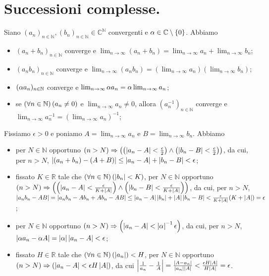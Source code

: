 \section{Successioni complesse.}\label{SuccessioniComplesse}
\begin{Theorem}
	Siano $(a_n)_{n \in \mathbb{N}}, (b_n)_{n \in \mathbb{N}} \in \mathbb{C}^\mathbb{N}$ convergenti e $\alpha \in \mathbb{C} \setminus \lbrace 0 \rbrace$. Abbiamo
	\begin{itemize}
		\item $(a_n + b_n)_{n \in \mathbb{N}}$ converge e $\lim_{n \rightarrow \infty} (a_n + b_n) = \lim_{n \rightarrow \infty} a_n + \lim_{n \rightarrow \infty} b_n$;
		\item $(a_n b_n)_{n \in \mathbb{N}}$ converge e $\lim_{n \rightarrow \infty} (a_n b_n) = \left ( \lim_{n \rightarrow \infty} a_n \right ) \left ( \lim_{n \rightarrow \infty} b_n \right )$;
		\item $(\alpha a_n)_{n \in \mathbb{N}}$ converge e $\lim_{n \rightarrow \infty} \alpha a_n = \alpha \lim_{n \rightarrow \infty} a_n$;
		\item se $\left ( \forall n \in \mathbb{N} \right ) \left ( a_n \neq 0 \right )$ e $\lim_{n \rightarrow \infty} a_n \neq 0$, allora $(a_n^{-1})_{n \in \mathbb{N}}$ converge e $\lim_{n \rightarrow \infty} a_n^{-1} = \left ( \lim_{n \rightarrow \infty} a_n \right )^{-1}$;
	\end{itemize}
\end{Theorem}
\Proof Fissiamo $\epsilon > 0$ e poniamo $A = \lim_{n \rightarrow \infty} a_n$ e $B = \lim_{n \rightarrow \infty} b_n$. Abbiamo
\begin{itemize}
	\item per $N \in \mathbb{N}$ opportuno $\left ( n > N \right ) \Rightarrow \left ( \left ( \left \lvert a_n - A \right \rvert < \frac{\epsilon}{2} \right ) \wedge \left ( \left \lvert b_n - B \right \rvert < \frac{\epsilon}{2} \right ) \right )$, da cui, per $n > N$, $\left \lvert (a_n + b_n) - (A + B) \right \rvert \leq \left \lvert a_n - A \right \rvert + \left \lvert b_n - B \right \rvert < \epsilon$;
	\item fissato $K \in \mathbb{R}$ tale che $\left ( \forall n \in \mathbb{N} \right ) \left ( \left \lvert b_n \right \rvert < K \right )$, per $N \in \mathbb{N}$ opportuno $\left ( n > N \right ) \Rightarrow \left ( \left ( \left \lvert a_n - A \right \rvert < \frac{\epsilon}{K + \left \lvert A \right \rvert} \right ) \wedge \left ( \left \lvert b_n - B \right \rvert < \frac{\epsilon}{K + \left \lvert A \right \rvert} \right ) \right )$, da cui, per $n > N$, $\left \lvert a_nb_n - AB \right \rvert = \left \lvert a_nb_n - Ab_n + Ab_n - AB \right \rvert \leq \left \lvert a_n - A \right \rvert\left \lvert b_n \right \rvert + \left \lvert A \right \rvert\left \lvert b_n - B \right \rvert < \frac{\epsilon}{K + \left \lvert A \right \rvert} (K + \left \lvert A \right \rvert) = \epsilon$;
	\item per $N \in \mathbb{N}$ opportuno $\left ( n > N \right ) \Rightarrow \left ( \left \lvert a_n - A \right \rvert < \left \lvert \alpha \right \rvert^{-1}\epsilon \right )$, da cui, per $n > N$, $\left \lvert \alpha a_n - \alpha A \right \rvert = \left \lvert \alpha \right \rvert\left \lvert a_n - A \right \rvert < \epsilon$;
	\item fissato $H \in \mathbb{R}$ tale che $\left ( \forall n \in \mathbb{N} \right ) \left ( \left \lvert a_n \right \rvert \right ) < H$, per $N \in \mathbb{N}$ opportuno $\left ( n > N \right ) \Rightarrow \left ( \left \lvert a_n - A \right \rvert < \epsilon H \left \lvert A \right \rvert \right )$, da cui $\left \lvert \frac{1}{a_n} - \frac{1}{A} \right \rvert = \frac{\left \lvert A - a_n \right \rvert}{\left \lvert a_n \right \rvert \left \lvert A \right \rvert} < \frac{\epsilon H \left \lvert A \right \rvert}{H \left \lvert A \right \rvert} = \epsilon$. \EndProof
\end{itemize}
